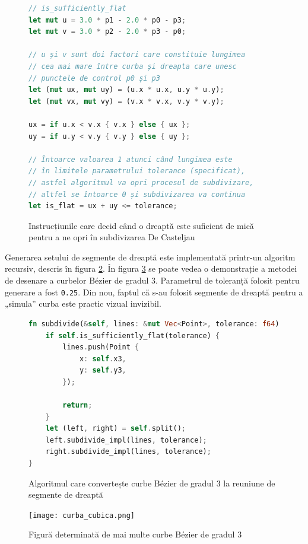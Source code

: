 \documentclass[a4paper, 12pt]{report}
\begin{document}
\begin{figure}[ht]
    \centering
    \begin{lstlisting}[language=Rust]
// is_sufficiently_flat
let mut u = 3.0 * p1 - 2.0 * p0 - p3;
let mut v = 3.0 * p2 - 2.0 * p3 - p0;

// u și v sunt doi factori care constituie lungimea
// cea mai mare între curba și dreapta care unesc
// punctele de control p0 și p3
let (mut ux, mut uy) = (u.x * u.x, u.y * u.y);
let (mut vx, mut vy) = (v.x * v.x, v.y * v.y);

ux = if u.x < v.x { v.x } else { ux };
uy = if u.y < v.y { v.y } else { uy };

// Întoarce valoarea 1 atunci când lungimea este
// în limitele parametrului tolerance (specificat),
// astfel algoritmul va opri procesul de subdivizare,
// altfel se întoarce 0 și subdivizarea va continua
let is_flat = ux + uy <= tolerance;
    \end{lstlisting}
    \caption{Instrucțiunile care decid când o dreaptă este suficient de mică pentru a ne opri în subdivizarea De Casteljau}
    \label{fig-cubic-split}
\end{figure}

Generarea setului de segmente de dreaptă este implementată printr-un algoritm recursiv, descris în figura \ref{fig-subdivision-algorithm}.
În figura \ref{fig-cubic-example} se poate vedea o demonstrație a metodei de desenare a curbelor Bézier de gradul 3.
Parametrul de toleranță folosit pentru generare a fost \texttt{0.25}. Din nou, faptul că s-au folosit segmente de dreaptă pentru a „simula”
curba este practic vizual invizibil.

\begin{figure}[ht]
    \centering
    \begin{lstlisting}[language=Rust]
fn subdivide(&self, lines: &mut Vec<Point>, tolerance: f64) {
    if self.is_sufficiently_flat(tolerance) {
        lines.push(Point {
            x: self.x3,
            y: self.y3,
        });

        return;
    }
    let (left, right) = self.split();
    left.subdivide_impl(lines, tolerance);
    right.subdivide_impl(lines, tolerance);
}
    \end{lstlisting}
    \caption{Algoritmul care convertește curbe Bézier de gradul 3 la reuniune de segmente de dreaptă}
    \label{fig-subdivision-algorithm}
\end{figure}

\begin{figure}[ht]
    \texttt{[image: curba\_cubica.png]}
    \centering
    \caption{Figură determinată de mai multe curbe Bézier de gradul 3}
    \label{fig-cubic-example}
\end{figure}
\end{document}
